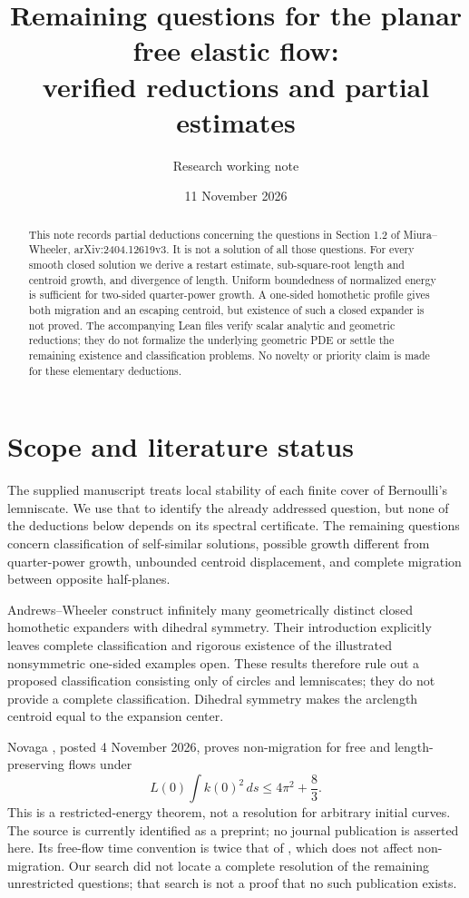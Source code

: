 \documentclass[11pt,a4paper]{article}
\title{Remaining questions for the planar free elastic flow:\\verified reductions and partial estimates}
\author{Research working note}
\date{11 November 2026}
\begin{document}
\maketitle
\begin{abstract}
This note records partial deductions concerning the questions in Section 1.2 of Miura--Wheeler, arXiv:2404.12619v3. It is not a solution of all those questions. For every smooth closed solution we derive a restart estimate, sub-square-root length and centroid growth, and divergence of length. Uniform boundedness of normalized energy is sufficient for two-sided quarter-power growth. A one-sided homothetic profile gives both migration and an escaping centroid, but existence of such a closed expander is not proved. The accompanying Lean files verify scalar analytic and geometric reductions; they do not formalize the underlying geometric PDE or settle the remaining existence and classification problems. No novelty or priority claim is made for these elementary deductions.
\end{abstract}

\section{Scope and literature status}
The supplied manuscript treats local stability of each finite cover of Bernoulli's lemniscate. We use that to identify the already addressed question, but none of the deductions below depends on its spectral certificate. The remaining questions concern classification of self-similar solutions, possible growth different from quarter-power growth, unbounded centroid displacement, and complete migration between opposite half-planes.

Andrews--Wheeler \cite{AW} construct infinitely many geometrically distinct closed homothetic expanders with dihedral symmetry. Their introduction explicitly leaves complete classification and rigorous existence of the illustrated nonsymmetric one-sided examples open. These results therefore rule out a proposed classification consisting only of circles and lemniscates; they do not provide a complete classification. Dihedral symmetry makes the arclength centroid equal to the expansion center.

Novaga \cite{N}, posted 4 November 2026, proves non-migration for free and length-preserving flows under
\[
 L(0)\int k(0)^2\,ds\le 4\pi^2+\frac83.
\]
This is a restricted-energy theorem, not a resolution for arbitrary initial curves. The source is currently identified as a preprint; no journal publication is asserted here. Its free-flow time convention is twice that of \cite{MW}, which does not affect non-migration. Our search did not locate a complete resolution of the remaining unrestricted questions; that search is not a proof that no such publication exists.
\end{document}
